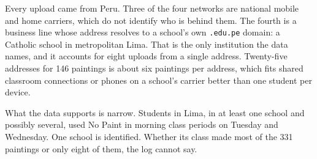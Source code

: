 \documentclass[10pt,letterpaper,twocolumn]{article}
\begin{document}
Every upload came from Peru. Three of the four networks are national
mobile and home carriers, which do not identify who is behind them. The
fourth is a business line whose address resolves to a school's own
\texttt{.edu.pe} domain: a Catholic school in metropolitan Lima. That
is the only institution the data names, and it accounts for eight
uploads from a single address. Twenty-five addresses for 146 paintings
is about six paintings per address, which fits shared classroom
connections or phones on a school's carrier better than one student per
device.

What the data supports is narrow. Students in Lima, in at least one
school and possibly several, used No Paint in morning class periods on
Tuesday and Wednesday. One school is identified. Whether its class made
most of the 331 paintings or only eight of them, the log cannot say.
\end{document}
